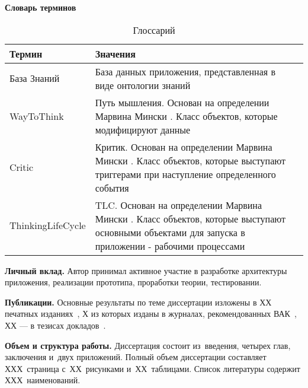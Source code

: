 \textbf{Словарь терминов}
\begin{table} [htbp]
   \centering
   \parbox{15cm}{\caption{Глоссарий}\label{Glossary}}
  \begin{tabular}{| p{5cm} ||p{5cm}|| p{5cm} |}
  \hline
  \hline
Термин & Значения \\
  \hline
  \hline
База Знаний	& База данных приложения, представленная в виде онтологии знаний \\
 \hline
WayToThink	& Путь мышления. Основан на определении Марвина Мински \cite{EmotionMachine}. Класс объектов, которые модифицируют данные \\
 \hline
Critic	& Критик. Основан на определении Марвина Мински \cite{EmotionMachine}. Класс объектов, которые выступают триггерами при наступление определенного события \\
 \hline
ThinkingLifeCycle	& TLC. Основан на определении Марвина Мински \cite{EmotionMachine}. Класс объектов, которые выступают основными объектами для запуска в приложении - рабочими процессами \\

 \hline
  \hline
\end{tabular}
\end{table}

\textbf{Личный вклад.} Автор принимал активное участие в разработке архитектуры приложения, реализации прототипа, проработки теории, тестировании.

\textbf{Публикации.} Основные результаты по теме диссертации изложены в ХХ печатных изданиях~\cite{Sychev,Sokolov,Gaidaenko,Lermontov,Management},
Х из которых изданы в журналах, рекомендованных ВАК~\cite{Sychev,Sokolov,Gaidaenko}, 
ХХ --- в тезисах докладов~\cite{Lermontov,Management}.

\textbf{Объем и структура работы.} Диссертация состоит из~введения, четырех глав, заключения и~двух приложений. Полный объем диссертации составляет ХХХ~страница с~ХХ~рисунками и~ХХ~таблицами. Список литературы содержит ХХХ~наименований.


\clearpage